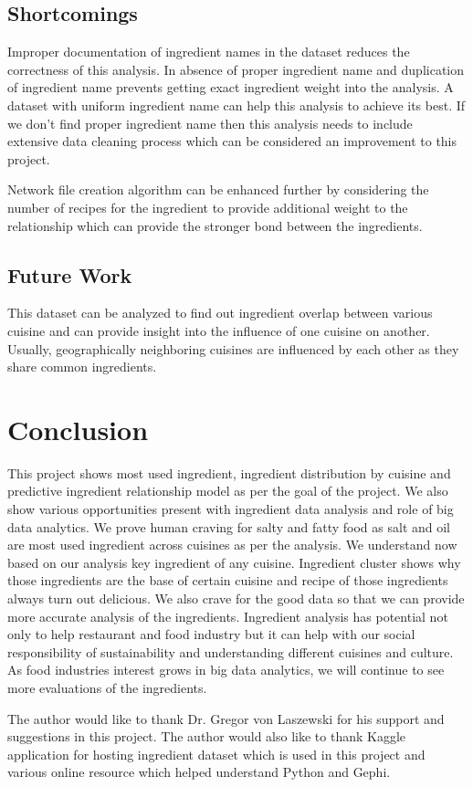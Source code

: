 \documentclass[sigconf]{acmart}
\begin{document}
\subsection{Shortcomings}
Improper documentation of ingredient names in the dataset reduces the correctness of this analysis. In absence of proper ingredient name and duplication of ingredient name prevents getting exact ingredient weight into the analysis. A dataset with uniform ingredient name can help this analysis to achieve its best. If we don't find proper ingredient name then this analysis needs to include extensive data cleaning process which can be considered an improvement to this project.

Network file creation algorithm can be enhanced further by considering the number of recipes for the ingredient to provide additional weight to the relationship which can provide the stronger bond between the ingredients. 

\subsection{Future Work}
This dataset can be analyzed to find out ingredient overlap between various cuisine and can provide insight into the influence of one cuisine on another. Usually, geographically neighboring cuisines are influenced by each other as they share common ingredients.

\section{Conclusion}
This project shows most used ingredient, ingredient distribution by cuisine and predictive ingredient relationship model as per the goal of the project. We also show various opportunities present with ingredient data analysis and role of big data analytics. We prove human craving for salty and fatty food as salt and oil are most used ingredient across cuisines as per the analysis. We understand now based on our analysis key ingredient of any cuisine. Ingredient cluster shows why those ingredients are the base of certain cuisine and recipe of those ingredients always turn out delicious. We also crave for the good data so that we can provide more accurate analysis of the ingredients. Ingredient analysis has potential not only to help restaurant and food industry but it can help with our social responsibility of sustainability and understanding different cuisines and culture. As food industries interest grows in big data analytics, we will continue to see more evaluations of the ingredients.  

\begin{acks}
  The author would like to thank Dr. Gregor von Laszewski for his support and suggestions in this project. The author would also like to thank Kaggle application for hosting ingredient dataset which is used in this project and various online resource which helped understand Python and Gephi.  
\end{acks}


 

\appendix


\end{document}
